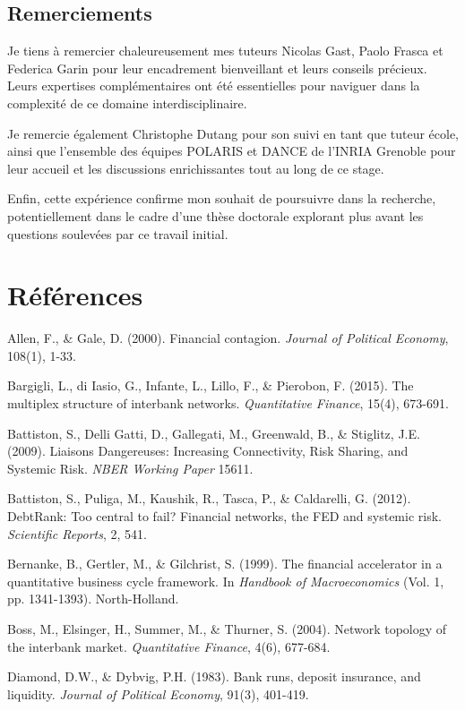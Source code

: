 \documentclass[12pt,a4paper,twoside]{article}
\begin{document}
\subsection{Remerciements}

Je tiens à remercier chaleureusement mes tuteurs Nicolas Gast, Paolo Frasca et Federica Garin pour leur encadrement bienveillant et leurs conseils précieux. Leurs expertises complémentaires ont été essentielles pour naviguer dans la complexité de ce domaine interdisciplinaire.

Je remercie également Christophe Dutang pour son suivi en tant que tuteur école, ainsi que l'ensemble des équipes POLARIS et DANCE de l'INRIA Grenoble pour leur accueil et les discussions enrichissantes tout au long de ce stage.

Enfin, cette expérience confirme mon souhait de poursuivre dans la recherche, potentiellement dans le cadre d'une thèse doctorale explorant plus avant les questions soulevées par ce travail initial.

\newpage

\section{Références}

Allen, F., \& Gale, D. (2000). Financial contagion. \textit{Journal of Political Economy}, 108(1), 1-33.

Bargigli, L., di Iasio, G., Infante, L., Lillo, F., \& Pierobon, F. (2015). The multiplex structure of interbank networks. \textit{Quantitative Finance}, 15(4), 673-691.

Battiston, S., Delli Gatti, D., Gallegati, M., Greenwald, B., \& Stiglitz, J.E. (2009). Liaisons Dangereuses: Increasing Connectivity, Risk Sharing, and Systemic Risk. \textit{NBER Working Paper} 15611.

Battiston, S., Puliga, M., Kaushik, R., Tasca, P., \& Caldarelli, G. (2012). DebtRank: Too central to fail? Financial networks, the FED and systemic risk. \textit{Scientific Reports}, 2, 541.

Bernanke, B., Gertler, M., \& Gilchrist, S. (1999). The financial accelerator in a quantitative business cycle framework. In \textit{Handbook of Macroeconomics} (Vol. 1, pp. 1341-1393). North-Holland.

Boss, M., Elsinger, H., Summer, M., \& Thurner, S. (2004). Network topology of the interbank market. \textit{Quantitative Finance}, 4(6), 677-684.

Diamond, D.W., \& Dybvig, P.H. (1983). Bank runs, deposit insurance, and liquidity. \textit{Journal of Political Economy}, 91(3), 401-419.
\end{document}
